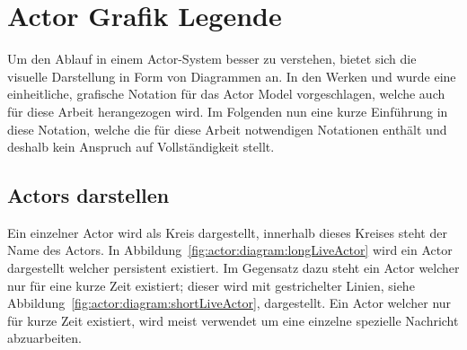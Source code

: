 \section{Actor Grafik Legende}\label{actor:diagram:description}
Um den Ablauf in einem Actor-System besser zu verstehen, bietet sich die visuelle Darstellung in Form von Diagrammen an. In den Werken \cite{kuhn2017reactive} und \cite{Vernon2015ReactiveAkka} wurde eine einheitliche, grafische Notation für das Actor Model vorgeschlagen, welche auch für diese Arbeit herangezogen wird. Im Folgenden nun eine kurze Einführung in diese Notation, welche die für diese Arbeit notwendigen Notationen enthält und deshalb kein Anspruch auf Vollständigkeit stellt.\\
\subsection{Actors darstellen}
Ein einzelner Actor wird als Kreis dargestellt, innerhalb dieses Kreises steht der Name des Actors. In Abbildung~\ref{fig:actor:diagram:longLiveActor} wird ein Actor dargestellt welcher persistent existiert. Im Gegensatz dazu steht ein Actor welcher nur für eine kurze Zeit existiert; dieser wird mit gestrichelter Linien, siehe Abbildung~\ref{fig:actor:diagram:shortLiveActor}, dargestellt. Ein Actor welcher nur für kurze Zeit existiert, wird meist verwendet um eine einzelne spezielle Nachricht abzuarbeiten.  
% 
% 

